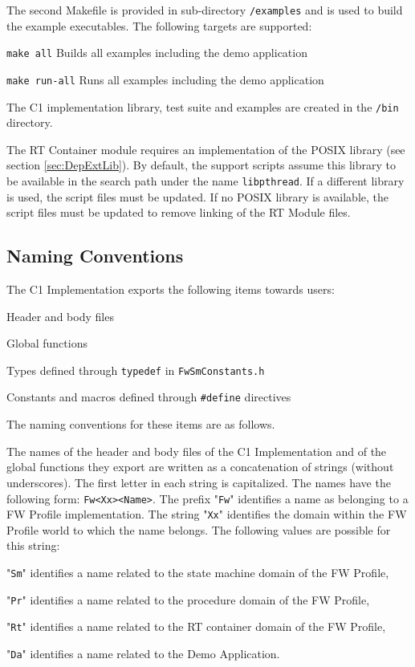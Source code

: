 \documentclass[manual]{../fwprofile}
\begin{document}
The second Makefile is provided in sub-directory \texttt{/examples} and is used to build the example executables. The following targets are supported:
\begin{fw_itemize}
\item \texttt{make all} Builds all examples including the demo application
\item \texttt{make run-all} Runs all examples including the demo application
\end{fw_itemize}

The C1 implementation library, test suite and examples are created in the \texttt{/bin} directory.

The RT Container module requires an implementation of the POSIX library (see section \ref{sec:DepExtLib}). By default, the support scripts assume this library to be available in the search path under the name \texttt{libpthread}. If a different library is used, the script files must be updated. If no POSIX library is available, the script files must be updated to remove linking of the RT Module files. 

\subsection{Naming Conventions}
The C1 Implementation exports the following items towards users:

\begin{fw_itemize}
\item Header and body files
\item Global functions
\item Types defined through \texttt{typedef} in \texttt{FwSmConstants.h}
\item Constants and macros defined through \texttt{\#define} directives
\end{fw_itemize}

The naming conventions for these items are as follows.
 
The names of the header and body files of the C1 Implementation and of the global 
functions they export are written as a concatenation of strings (without underscores). 
The first letter in each string is capitalized. The names have the following form: 
\texttt{Fw<Xx><Name>}. The prefix "\texttt{Fw}" identifies a name as belonging to a FW Profile 
implementation. The string "\texttt{Xx}" identifies the domain within the FW Profile world 
to which the name belongs. The following values are possible for this string: 

\begin{fw_itemize}
\item "\texttt{Sm}" identifies a name related to the state machine domain of the FW Profile, 
\item "\texttt{Pr}" identifies a name related to the procedure domain of the FW Profile,  
\item "\texttt{Rt}" identifies a name related to the RT container domain of the FW Profile,  
\item "\texttt{Da}" identifies a name related to the Demo Application.
\end{fw_itemize}
\end{document}
